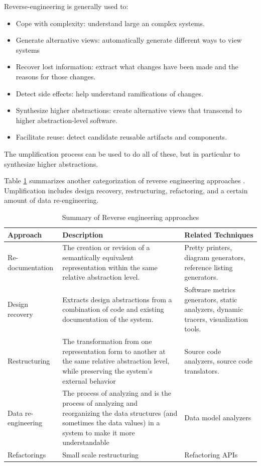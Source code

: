 Reverse-engineering is generally used to:
\begin{itemize}
\item Cope with complexity: understand large an complex systems.
\item Generate alternative views: automatically generate different ways to view systems
\item Recover lost information: extract what changes have been made and the reasons for those changes.
\item Detect side effects: help understand ramifications of changes.
\item Synthesize higher abstractions:  create alternative views that transcend to higher abstraction-level software.
\item Facilitate reuse: detect candidate reusable artifacts and components.
\end{itemize}

The umplification process can be used to do all of these, but in particular to synthesize higher abstractions.

Table \ref{table:approachesRE} summarizes another categorization  of reverse engineering approaches \cite{Chikofsky}. Umplification includes design recovery, restructuring, refactoring, and a certain amount of data re-engineering.

\begin{table}[h]
\centering
\caption{Summary of Reverse engineering approaches \cite{Chikofsky}}
\label{table:approachesRE}
\begin{tabular}{l|p{6cm}|p{4cm}}
\toprule
\rowcolor[HTML]{BBDAFF}
\textbf{Approach} & \textbf{Description}  & \textbf{Related Techniques}  \\ \midrule
Re-documentation 
&  The creation or revision of a semantically equivalent representation within the same relative abstraction level. 
& Pretty printers, diagram generators, reference listing generators.\\ \hline

Design recovery & Extracts design abstractions from a combination of code and existing documentation of the system. & Software metrics generators, static analyzers, dynamic tracers, visualization tools. \\ \hline

Restructuring & The transformation from one representation form to another at the same relative  abstraction level, while preserving the system's external behavior & Source code analyzers, source code translators.   \\ \hline

Data re-engineering & The process of analyzing and is the process of analyzing and
reorganizing the data structures (and sometimes the data values) in a system to make it more understandable & Data model analyzers  \\ \hline
Refactorings & Small scale restructuring & Refactoring APIs \\ 
\bottomrule 
\end{tabular}
\end{table}

